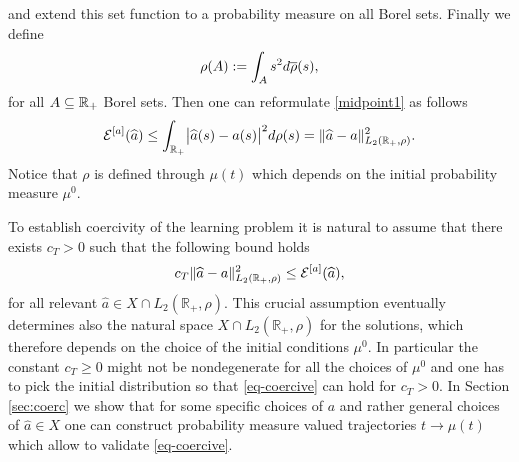 and extend this set function to a probability measure on all Borel sets. Finally we define
\begin{equation}
 \rho(A):=\int_A s^2 d\overline\rho(s),
 \label{rho}
\end{equation}
for all  $A\subseteq\mathbb{R}_+$ Borel sets.
Then one can reformulate \eqref{midpoint1} as follows
\begin{align}\label{midpoint2}
	\mathcal E^{[a]}(\widehat a)\leq \int_{\mathbb{R}_+}\bigl|\widehat a(s)-a(s)\bigr|^2 d \rho(s)
		=\| \widehat a - a \|^2_{L_2(\mathbb R_+,\rho)}.
\end{align}
Notice that $\rho$ is defined through $\mu(t)$ which depends on the initial probability measure $\mu^0$. 

To establish coercivity of the learning problem
it is natural to assume that there exists  $c_T>0$ such that the following bound holds
\begin{align}\label{eq-coercive}%
	c_T \| \widehat a - a \|^2_{L_2(\mathbb R_+,\rho)} \leq \Eahat,
\end{align}
for all relevant $\widehat a \in X \cap  L_2(\mathbb R_+,\rho)$. This crucial assumption eventually determines also the natural space $X \cap  L_2(\mathbb R_+,\rho)$ for the solutions,
which therefore depends on the choice of the initial conditions $\mu^0$. In particular the constant $c_T\geq 0$ might not be nondegenerate for all the choices of $\mu^0$
and one has to pick the initial distribution so that \eqref{eq-coercive} can hold for $c_T >0$. 
In Section \ref{sec:coerc} we show that for some specific choices of $a$ and rather general choices of $\widehat a \in X$ one can construct probability measure valued trajectories $t \to \mu(t)$ which allow to validate
\eqref{eq-coercive}.

